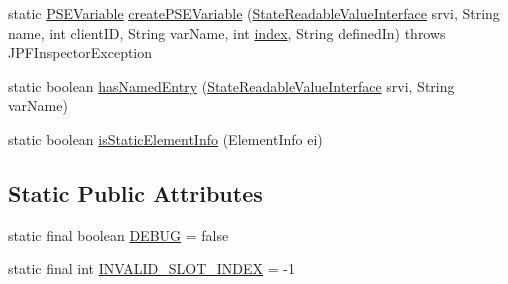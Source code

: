 \begin{DoxyCompactItemize}
\item 
static \hyperlink{classgov_1_1nasa_1_1jpf_1_1inspector_1_1common_1_1pse_1_1_p_s_e_variable}{P\+S\+E\+Variable} \hyperlink{classgov_1_1nasa_1_1jpf_1_1inspector_1_1server_1_1programstate_1_1_state_value_a899ba1974881fe409b9b58d0ba90f3b5}{create\+P\+S\+E\+Variable} (\hyperlink{interfacegov_1_1nasa_1_1jpf_1_1inspector_1_1server_1_1programstate_1_1_state_readable_value_interface}{State\+Readable\+Value\+Interface} srvi, String name, int client\+ID, String var\+Name, int \hyperlink{classgov_1_1nasa_1_1jpf_1_1inspector_1_1server_1_1programstate_1_1_state_value_stack_slot_aaa652f9cedf942095d9f6966cc2ebe3d}{index}, String defined\+In)  throws J\+P\+F\+Inspector\+Exception 
\item 
static boolean \hyperlink{classgov_1_1nasa_1_1jpf_1_1inspector_1_1server_1_1programstate_1_1_state_value_acf7b963024cd7f1cd5c23975621f83c7}{has\+Named\+Entry} (\hyperlink{interfacegov_1_1nasa_1_1jpf_1_1inspector_1_1server_1_1programstate_1_1_state_readable_value_interface}{State\+Readable\+Value\+Interface} srvi, String var\+Name)
\item 
static boolean \hyperlink{classgov_1_1nasa_1_1jpf_1_1inspector_1_1server_1_1programstate_1_1_state_value_a25dfd1e417420303104033dd3342c659}{is\+Static\+Element\+Info} (Element\+Info ei)
\end{DoxyCompactItemize}
\subsection*{Static Public Attributes}
\begin{DoxyCompactItemize}
\item 
static final boolean \hyperlink{classgov_1_1nasa_1_1jpf_1_1inspector_1_1server_1_1programstate_1_1_state_value_stack_slot_a534b308e096f779c363e5970565f4e1a}{D\+E\+B\+UG} = false
\item 
static final int \hyperlink{classgov_1_1nasa_1_1jpf_1_1inspector_1_1server_1_1programstate_1_1_state_value_stack_slot_a0b33717f44d3ca64410124dfbcf452dc}{I\+N\+V\+A\+L\+I\+D\+\_\+\+S\+L\+O\+T\+\_\+\+I\+N\+D\+EX} = -\/1
\end{DoxyCompactItemize}
